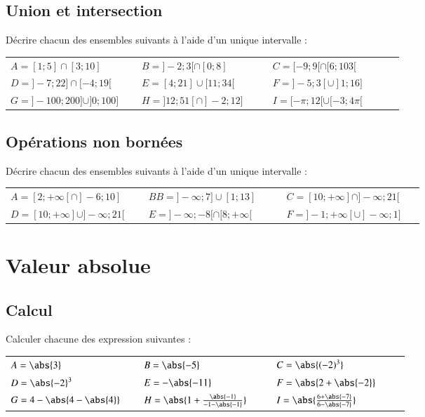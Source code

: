 \documentclass[oneside,12pt]{article}          %
\begin{document}
\subsection{Union et intersection}
Décrire chacun des ensembles suivants à l'aide d'un unique intervalle :

\begin{tabular}{p{0.3\linewidth} p{0.3\linewidth} p{0.3\linewidth}}
	$A=[1;5]\cap[3;10]$ & $B=]-2;3[\cap[0;8]$ & $C=[-9;9[\cap[6;103[$ \\
	$D=]-7;22]\cap[-4;19[$ & $E=[4;21]\cup[11;34[$ & $F=]-5;3[\cup]1;16]$ \\
	$G=]-100;200]\cup]0;100]$  & $H=]12;51[\cap]-2;12]$ & $I=[-\pi;12[\cup[-3;4\pi[$
\end{tabular}



\subsection{Opérations non bornées}
Décrire chacun des ensembles suivants à l'aide d'un unique intervalle :

\begin{tabular}{p{0.3\linewidth} p{0.3\linewidth} p{0.3\linewidth}}
	$A=[2;+\infty[\cap]-6;10]$& $BB=]-\infty;7]\cup[1;13]$ & $C=[10;+\infty]\cap]-\infty;21[$ \\
	$D=[10;+\infty]\cup]-\infty;21[$ & $E=]-\infty;-8[\cap[8;+\infty[$ & $F=]-1;+\infty[\cup]-\infty;1]$
\end{tabular}






\section{Valeur absolue}

\subsection{Calcul}
Calculer chacune des expression suivantes :

\begin{tabular}{p{0.3\linewidth} p{0.3\linewidth} p{0.3\linewidth}}
	$A=\abs{3}$ & $B=\abs{-5}$ & $C=\abs{(-2)^3}$ \\
	$D=\abs{-2}^3$ & $E=-\abs{-11}$ & $F=\abs{2+\abs{-2}}$ \\
	$G=4-\abs{4-\abs{4}}$ & $H=\abs{1+\frac{\abs{-1}}{-1-\abs{-1}}}$ & $I=\abs{\frac{6+\abs{-7}}{6-\abs{-7}}}$
\end{tabular}
\end{document}
